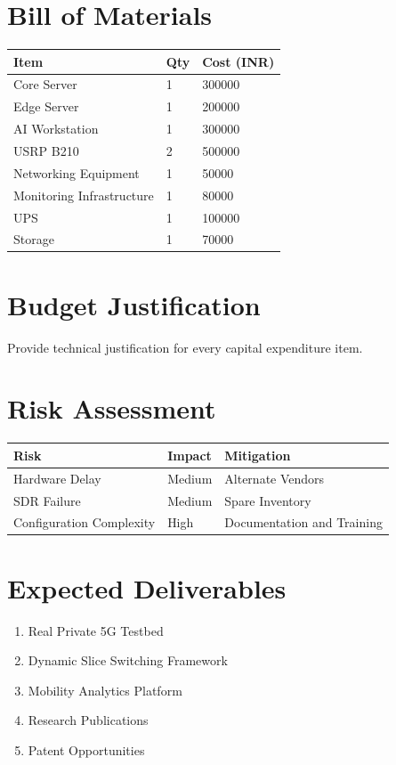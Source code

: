 \documentclass[12pt,a4paper]{article}
\begin{document}
\section{Bill of Materials}
\begin{longtable}{|p{8cm}|p{3cm}|p{3cm}|}
\hline
Item & Qty & Cost (INR)\\
\hline
Core Server & 1 & 300000\\
Edge Server & 1 & 200000\\
AI Workstation & 1 & 300000\\
USRP B210 & 2 & 500000\\
Networking Equipment & 1 & 50000\\
Monitoring Infrastructure & 1 & 80000\\
UPS & 1 & 100000\\
Storage & 1 & 70000\\
\hline
\end{longtable}

\section{Budget Justification}
Provide technical justification for every capital expenditure item.


\section{Risk Assessment}
\begin{longtable}{|p{4cm}|p{4cm}|p{5cm}|}
\hline
Risk & Impact & Mitigation\\
\hline
Hardware Delay & Medium & Alternate Vendors\\
SDR Failure & Medium & Spare Inventory\\
Configuration Complexity & High & Documentation and Training\\
\hline
\end{longtable}



\section{Expected Deliverables}
\begin{enumerate}
\item Real Private 5G Testbed
\item Dynamic Slice Switching Framework
\item Mobility Analytics Platform
\item Research Publications
\item Patent Opportunities
\end{enumerate}
\end{document}

